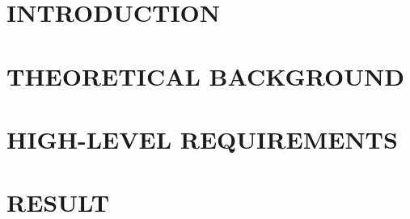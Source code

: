 \documentclass[a4paper,13pt,3p,twoside]{report}
\theoremstyle{definition}
\begin{document}
\glsaddall
\renewcommand*{\acronymname}{LIST OF ABBREVIATIONS}
\renewcommand*{\entryname}{Abriviation}
\renewcommand*{\descriptionname}{Full Expression}
\printnoidxglossaries

% 

% 

\newpage
{}

\pagestyle{fancy}
\fancyhf{}
\fancyhead[RE, LO]{\leftmark}
\fancyfoot[RE, LO]{\thepage}

\chapter{INTRODUCTION}
\label{chapter:Introduction}

\newpage
\chapter{THEORETICAL BACKGROUND}
\label{chapter:Related_works}


\newpage
\chapter{HIGH-LEVEL REQUIREMENTS}
\label{chapter:Methodology}


\newpage
\chapter{RESULT}
\label{chapter:Experiment}


% 

\newpage
\end{document}
